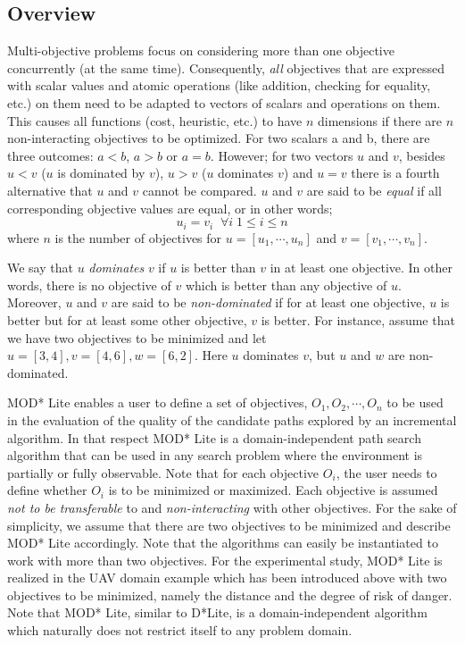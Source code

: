 \documentclass[10pt,journal]{IEEEtran}
\begin{document}
\subsection{Overview}
Multi-objective problems focus on considering more than one objective concurrently (at the same time). Consequently, \textit{all} objectives that are expressed with scalar values and atomic operations (like addition, checking for equality, etc.) on them need to be adapted to vectors of scalars and operations on them. This causes all functions (cost, heuristic, etc.) to have $n$ dimensions if there are $n$ non-interacting objectives to be optimized. For two scalars a and b, there are three outcomes: $a<b$, $a>b$ or $a=b$. However; for two vectors $u$ and $v$, besides $u<v$ ($u$ is dominated by $v$), $u>v$ ($u$ dominates $v$) and $u=v$ there is a fourth alternative that $u$ and $v$ cannot be compared. $u$ and $v$ are said to be \textit{equal} if all corresponding objective values are equal, or in other words;
\[ u_{i} = v_{i} \;\; \forall i \; 1 \leq i \leq n	  \] where $n$ is the number of objectives for $u=[u_1, \cdots, u_n]$ and $v=[v_1,\cdots,v_n]$. 

We say that $u$ \textit{dominates} $v$ if $u$ is better than $v$ in at least one objective. In other words, there is no objective of $v$ which is better than any objective of $u$. Moreover, $u$ and $v$ are said to be \textit{non-dominated} if for at least one objective,  $u$ is better but for at least some other objective, $v$ is better. For instance, assume that we have two objectives to be minimized and let $u=[3,4], v=[4,6], w=[6,2] $. Here $u$ dominates $v$, but $u$ and $w$ are non-dominated.

MOD* Lite enables a user to define a set of objectives, $O_1, O_2, \cdots, O_n$ to be used in the evaluation of the quality of the candidate paths explored by an incremental algorithm. In that respect MOD* Lite is a domain-independent path search algorithm that can be used in any search problem where the environment is partially or fully observable. Note that for each objective $O_i$, the user needs to define whether $O_i$ is to be minimized or maximized. Each objective is assumed \textit{not to be transferable} to and \textit{non-interacting} with other objectives.  For the sake of simplicity, we assume that there are two objectives to be minimized and describe MOD* Lite accordingly. Note that the algorithms can easily be instantiated to work with more than two objectives. For the experimental study, MOD* Lite is realized in the UAV domain example which has been introduced above with two objectives to be minimized, namely the distance and the degree of risk of danger. Note that MOD* Lite, similar to D*Lite, is a domain-independent algorithm which naturally does not restrict itself to any problem domain. 
\end{document}
